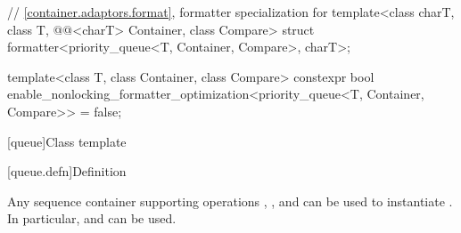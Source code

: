 \begin{codeblock}
{  // \ref{container.adaptors.format}, formatter specialization for 
  template<class charT, class T, @@<charT> Container, class Compare>
    struct formatter<priority_queue<T, Container, Compare>, charT>;

  template<class T, class Container, class Compare>
    constexpr bool
      enable_nonlocking_formatter_optimization<priority_queue<T, Container, Compare>> = false;
}
\end{codeblock}

[queue]{Class template }

[queue.defn]{Definition}

\pnum
{}%
Any sequence container supporting operations
,
,
and
can be used to instantiate
.
In particular,
and
can be used.

